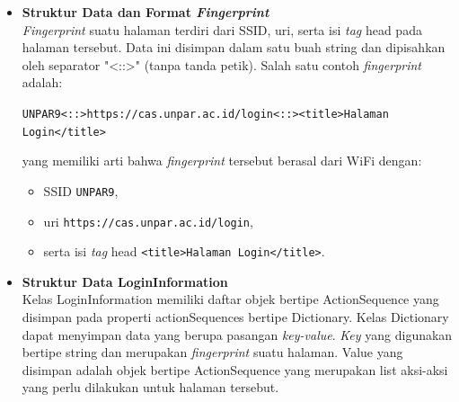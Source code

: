 \documentclass[a4paper,twoside]{article}
\begin{document}
\begin{enumerate}
\begin{itemize}
{\begin{itemize}
{                        \hfill

                        Algoritma di atas menjelaskan deteksi \textit{captive portal} dilakukan dengan melakukan deteksi jaringan yang tidak terhubung dengan internet. Jika ditemukan jaringan yang tidak terhubung dengan internet, maka akan muncul notifikasi yang memungkinkan pengguna untuk menjalankan perangkat lunak. Saat perangkat lunak dijalankan, perangkat lunak akan mencoba untuk mengakses halaman pancingan yang beralamatkan pada:
                        \begin{center}\texttt{http://107.172.253.111/network\_status.html}\end{center}
                        Jika didapat respon HTTP yang berupa \textit{redirect}, maka pada jaringan tersebut terdapat \textit{captive portal}. Algoritma ini akan didaftarkan pada sistem saat perangkat lunak pertama kali dijalankan dan dipanggil saat ada perubahan status jaringan.
                    }
                    \item{
                        {\bf Struktur Data dan Format \textit{Fingerprint}}\\
                        \textit{Fingerprint} suatu halaman terdiri dari SSID, uri, serta isi \textit{tag} head pada halaman tersebut. Data ini disimpan dalam satu buah string dan dipisahkan oleh separator "<::>" (tanpa tanda petik). Salah satu contoh \textit{fingerprint} adalah:
                        \begin{center}
                            \texttt{UNPAR9<::>https://cas.unpar.ac.id/login<::><title>Halaman Login</title>}
                        \end{center}
                        yang memiliki arti bahwa \textit{fingerprint} tersebut berasal dari WiFi dengan:
                        \begin{itemize}
                            \item{SSID \texttt{UNPAR9},}
                            \item{uri \texttt{https://cas.unpar.ac.id/login},}
                            \item{serta isi \textit{tag} head \texttt{<title>Halaman Login</title>}.}
                        \end{itemize}
                    }
                    \item{
                        {\bf Struktur Data LoginInformation}\\
                        Kelas LoginInformation memiliki daftar objek bertipe ActionSequence yang disimpan pada properti actionSequences bertipe Dictionary. Kelas Dictionary dapat menyimpan data yang berupa pasangan \textit{key-value}. \textit{Key} yang digunakan bertipe string dan merupakan \textit{fingerprint} suatu halaman. Value yang disimpan adalah objek bertipe ActionSequence yang merupakan list aksi-aksi yang perlu dilakukan untuk halaman tersebut.

}
\end{itemize}}
\end{itemize}
\end{enumerate}
\end{document}
